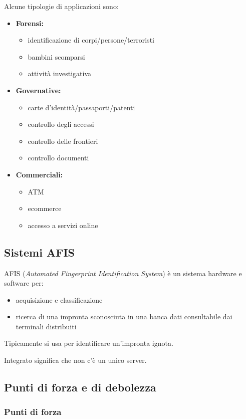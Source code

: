 Alcune tipologie di applicazioni sono:
\begin{itemize}
    \item \textbf{Forensi:}
    \begin{itemize}
        \item identificazione di corpi/persone/terroristi
        \item bambini scomparsi
        \item attività investigativa
    \end{itemize}
    \item  \textbf{Governative:}
    \begin{itemize}
        \item carte d'identità/passaporti/patenti
        \item controllo degli accessi
        \item controllo delle frontieri
        \item controllo documenti
    \end{itemize}
    \item \textbf{Commerciali:}
    \begin{itemize}
        \item ATM
        \item ecommerce
        \item accesso a servizi online
    \end{itemize}
\end{itemize}

\subsection{Sistemi AFIS}

AFIS (\textit{Automated Fingerprint Identification System}) è un sistema hardware e software
per:
\begin{itemize}
    \item acquisizione e classificazione
    \item ricerca di una impronta sconosciuta in una banca dati consultabile 
    dai terminali distribuiti
\end{itemize}
Tipicamente si usa per identificare un'impronta ignota.

Integrato significa che non c'è un unico server.


\subsection{Punti di forza e di debolezza}
\subsubsection{Punti di forza}

